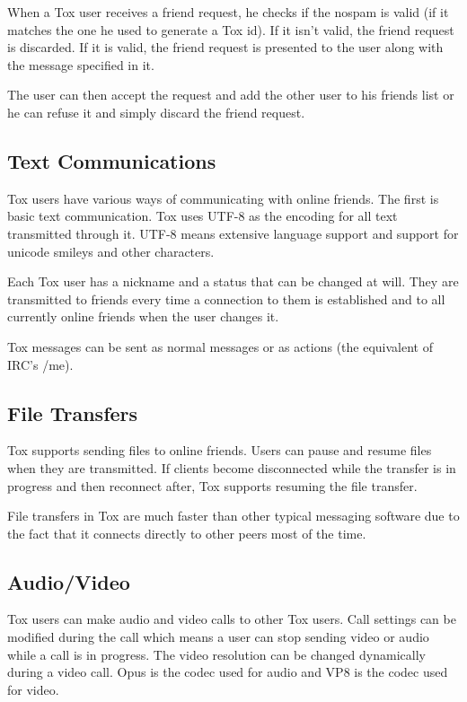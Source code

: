 \documentclass{tox}
\begin{document}
When a Tox user receives a friend request, he checks if the nospam is valid (if 
it matches the one he used to generate a Tox id). If it isn't valid, the friend 
request is discarded. If it is valid, the friend request is presented to the 
user along with the message specified in it.

The user can then accept the request and add the other user to his friends list 
or he can refuse it and simply discard the friend request.

\subsection{Text Communications}

Tox users have various ways of communicating with online friends. The first is 
basic text communication. Tox uses UTF-8 as the encoding for all text 
transmitted through it. UTF-8 means extensive language support and support for 
unicode smileys and other characters.

Each Tox user has a nickname and a status that can be changed at will. They are 
transmitted to friends every time a connection to them is established and to 
all currently online friends when the user changes it.

Tox messages can be sent as normal messages or as actions (the equivalent of 
IRC's /me).

\subsection{File Transfers}

Tox supports sending files to online friends. Users can pause and resume files 
when they are transmitted. If clients become disconnected while the transfer is 
in progress and then reconnect after, Tox supports resuming the file transfer.

File transfers in Tox are much faster than other typical messaging software due 
to the fact that it connects directly to other peers most of the time.

\subsection{Audio/Video}

Tox users can make audio and video calls to other Tox users. Call settings can 
be modified during the call which means a user can stop sending video or audio 
while a call is in progress. The video resolution can be changed dynamically 
during a video call. Opus is the codec used for audio and VP8 is the codec used 
for video.
\end{document}
